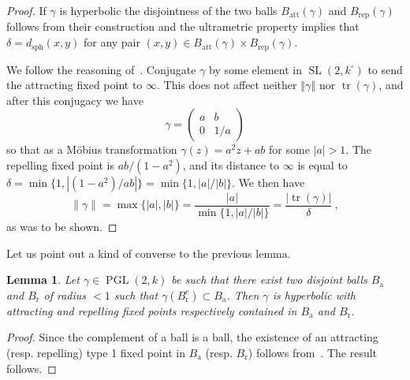 \documentclass[10pt]{amsart}
\newtheorem{lemm}[theo]{Lemma}\newtheorem{prop}[theo]{Proposition}\newtheorem{coro}[theo]{Corollary}\newtheorem{conj}[theo]{Conjecture}
\theoremstyle{definition}\newtheorem{defi}[theo]{Definition}\newtheorem{rema}[theo]{Remark}\newtheorem{exam}[theo]{Example}\newtheorem{exem}[theo]{Example}\newtheorem{nota}[theo]{Notation}
\DeclareMathOperator{\tr}{tr}
\DeclareMathOperator{\sph}{sph}
\DeclareMathOperator{\SL}{SL}
\DeclareMathOperator{\PGL}{PGL}
\newcommand{\norm}[1]{\left\Vert#1\right\Vert}
\newcommand{\abs}[1]{\left\vert#1\right\vert}
\newcommand{\att}{\mathrm{att}}
\newcommand{\rep}{\mathrm{rep}}
\begin{document}
\begin{proof}
If $\gamma$ is hyperbolic the disjointness of the two balls $B_\att(\gamma)$ and $B_\rep(\gamma)$ follows from their construction and the ultrametric property implies that $\delta = d_{\sph} (x,y)$ for any pair $(x,y)\in B_\att(\gamma) \times B_\rep(\gamma)$.

We follow the reasoning of~\cite[Lem.~2.1]{kleinbif}. Conjugate $\gamma$ by some element in $\SL(2,k^\circ)$ to send the attracting fixed point to $\infty$. This does not affect neither $\norm{\gamma}$ nor $\tr(\gamma)$, and after this
conjugacy we have
\[
\gamma =
\begin{pmatrix} a & b \\ 0 & 1/a
\end{pmatrix}
\]
so that as a M\"obius transformation
$\gamma(z) = a^2z+ ab$ for some $\abs{a}>1$. The repelling fixed point is $ab/(1-a^2)$, and its distance to $\infty$ is equal to $\delta = \min \{ 1, |(1-a^2)/ab|\} = \min \{ 1, {\abs{a}}/{\abs{b}}\}$. We then have
\[
\| \gamma \| = \max\{ |a|, |b|\} = \frac{|a|}{\min \{ 1, {\abs{a}}/{\abs{b}}\}} = \frac{|\tr(\gamma)|}{\delta}~,
\]
as was to be shown.
\end{proof}

Let us point out a kind of converse to the previous lemma.

\begin{lemm}\label{lem:distinct balls}
Let $\gamma \in \PGL(2,k)$ be such that there exist two disjoint balls $B_\mathrm{a}$ and $B_\mathrm{r}$ of radius $<1$ such that $\gamma(B_\mathrm{r}^c)\subset B_\mathrm{a}$. Then $\gamma$ is hyperbolic with attracting and repelling fixed points respectively contained in $B_\mathrm{a}$ and $B_\mathrm{r}$.
\end{lemm}

\begin{proof}
Since the complement of a ball is a ball, the existence of an attracting (resp. repelling) type 1 fixed point in $B_\mathrm{a}$ (resp. $B_\mathrm{r}$) follows from~\cite[Thm.~10.69]{baker-rumely}. The result follows.
\end{proof}
\end{document}
